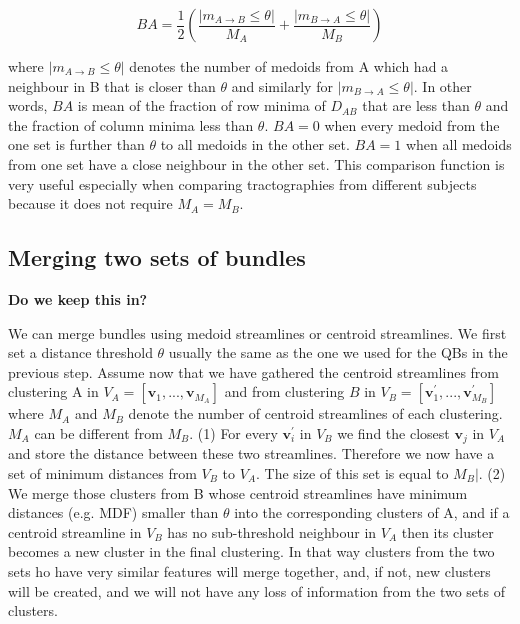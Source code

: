 \documentclass{bioinfo}
\begin{document}
\begin{methods}
\begin{equation}
BA=\frac{1}{2}\left(\frac{|m_{A\rightarrow B}\leq \theta |}{M_{A}}+\frac{|m_{B\rightarrow A}\leq \theta |}{M_{B}}\right)\label{eq:TC}
\end{equation}

\noindent where $|m_{A\rightarrow B}\leq \theta |$ denotes the number of
medoids from A which had a neighbour in B that is closer than $\theta$
and similarly for $|m_{B\rightarrow A}\leq \theta |$.  In other words,
$BA$ is mean of the fraction of row minima of $D_{AB}$ that are less
than $\theta$ and the fraction of column minima less than $\theta$.
$BA=0$ when every medoid from the one set is further than $\theta$ to
all medoids in the other set. $BA=1$ when all medoids from one set have
a close neighbour in the other set. This comparison function is very
useful especially when comparing tractographies from different subjects
because it does not require $M_{A}=M_{B}$.

\subsection{Merging two sets of bundles\label{sub:merging}}

\textbf{Do we keep this in?}

We can merge bundles using medoid streamlines or centroid
streamlines. We first set a distance threshold $\theta$ usually the same
as the one we used for the QBs in the previous step. Assume now that we
have gathered the centroid streamlines from clustering A in
$V_{A}=[\mathbf{v}_{1},...,\mathbf{v}_{M_{A}}]$ and from clustering $B$
in $V_{B}=[\mathbf{v}_{1}^{'},...,\mathbf{v}_{M_{B}}^{'}]$ where $M_A$
and $M_B$ denote the number of centroid streamlines of each clustering.
$M_{A}$ can be different from $M_{B}$. (1) For every
$\mathbf{v}_{i}^{'}$ in $V_{B}$ we find the closest $\mathbf{v}_{j}$ in
$V_{A}$ and store the distance between these two streamlines. Therefore
we now have a set of minimum distances from $V_{B}$ to $V_{A}$. The size
of this set is equal to $M_{B}|$. (2) We merge those clusters from B
whose centroid streamlines have minimum distances (e.g. MDF) smaller than
$\theta$ into the corresponding clusters of A, and if a centroid
streamline in $V_{B}$ has no sub-threshold neighbour in $V_{A}$ then its
cluster becomes a new cluster in the final clustering. In that way
clusters from the two sets ho have very similar features will merge
together, and, if not, new clusters will be created, and we will not
have any loss of information from the two sets of clusters.


\end{methods}
\end{document}
